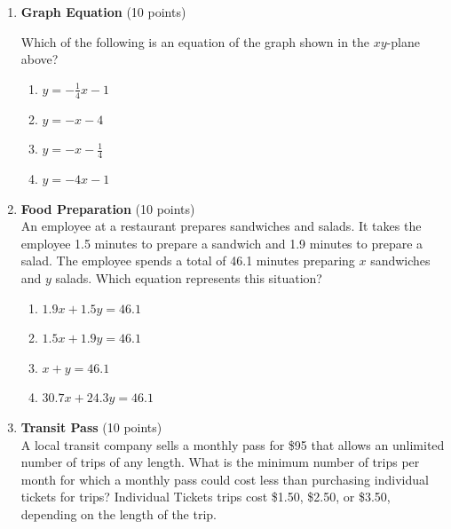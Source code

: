 \begin{enumerate}
  \item \textbf{Graph Equation} (10 points)\\

  Which of the following is an equation of the graph shown in the $xy$-plane above?\\
  \begin{enumerate}[label=(\Alph*)]
    \item $y=-\frac{1}{4}x-1$
    \item $y=-x-4$
    \item $y=-x-\frac{1}{4}$
    \item $y=-4x-1$
  \end{enumerate}
  \begin{subanswer}
  \end{subanswer}

  \item \textbf{Food Preparation} (10 points)\\
  An employee at a restaurant prepares sandwiches and salads. It takes the employee 1.5 minutes to prepare a sandwich and 1.9 minutes to prepare a salad. The employee spends a total of 46.1 minutes preparing $x$ sandwiches and $y$ salads. Which equation represents this situation?\\
  \begin{enumerate}[label=(\Alph*)]
    \item $1.9x+1.5y=46.1$
    \item $1.5x+1.9y=46.1$
    \item $x+y=46.1$
    \item $30.7x+24.3y=46.1$
  \end{enumerate}
  \begin{subanswer}
  \end{subanswer}

  \item \textbf{Transit Pass} (10 points)\\
  A local transit company sells a monthly pass for \$95 that allows an 
  unlimited number of trips of any length. 
  What is the minimum number of trips per month for which a monthly 
  pass could cost less than purchasing individual tickets for trips?
  Individual Tickets trips cost \$1.50, \$2.50, or \$3.50, 
  depending on the length of the trip.
  \begin{subanswer}
  \end{subanswer}


\end{enumerate}
